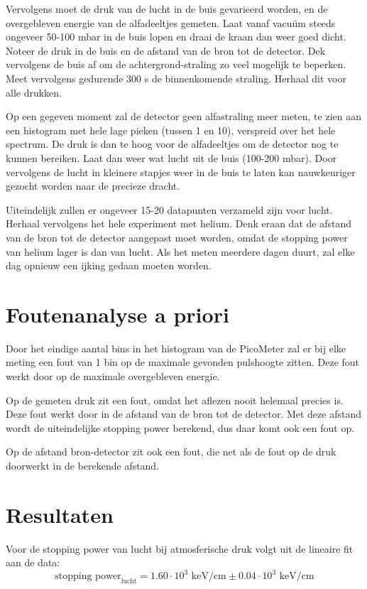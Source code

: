 \documentclass[11pt,a4paper]{article}
\begin{document}
Vervolgens moet de druk van de lucht in de buis gevarieerd worden, en de overgebleven energie van de alfadeeltjes gemeten. Laat vanaf vacuüm steeds ongeveer 50-100 mbar in de buis lopen en draai de kraan dan weer goed dicht. Noteer de druk in de buis en de afstand van de bron tot de detector. Dek vervolgens de buis af om de achtergrond-straling zo veel mogelijk te beperken. Meet vervolgens gedurende 300 s de binnenkomende straling. Herhaal dit voor alle drukken.\par
Op een gegeven moment zal de detector geen alfastraling meer meten, te zien aan een histogram met hele lage pieken (tussen 1 en 10), verspreid over het hele spectrum. De druk is dan te hoog voor de alfadeeltjes om de detector nog te kunnen bereiken. Laat dan weer wat lucht uit de buis (100-200 mbar). Door vervolgens de lucht in kleinere stapjes weer in de buis te laten kan nauwkeuriger gezocht worden naar de precieze dracht. \par
Uiteindelijk zullen er ongeveer 15-20 datapunten verzameld zijn voor lucht. Herhaal vervolgens het hele experiment met helium. Denk eraan dat de afstand van de bron tot de detector aangepast moet worden, omdat de stopping power van helium lager is dan van lucht. Als het meten meerdere dagen duurt, zal elke dag opnieuw een ijking gedaan moeten worden.

\section{Foutenanalyse a priori}
Door het eindige aantal bins in het histogram van de PicoMeter zal er bij elke meting een fout van 1 bin op de maximale gevonden pulshoogte zitten. Deze fout werkt door op de maximale overgebleven energie.\par
Op de gemeten druk zit een fout, omdat het aflezen nooit helemaal precies is. Deze fout werkt door in de afstand van de bron tot de detector. Met deze afstand wordt de uiteindelijke stopping power berekend, dus daar komt ook een fout op. \par
Op de afstand bron-detector zit ook een fout, die net als de fout op de druk doorwerkt in de berekende afstand.




\newpage

\section*{Resultaten}
Voor de stopping power van lucht bij atmosferische druk volgt uit de lineaire fit aan de data:
\begin{equation}
\text{stopping power}_\mathrm{lucht} = 1.60 \cdot 10^3 \text{ keV/cm} \pm 0.04 \cdot 10^3 \text{ keV/cm}
\end{equation}
\end{document}
